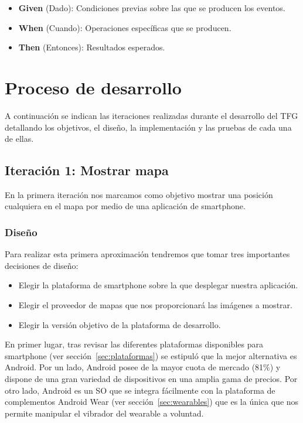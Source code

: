 \begin{itemize}
  \item \textbf{Given} (Dado): Condiciones previas sobre las que se producen los eventos.
  \item \textbf{When} (Cuando): Operaciones específicas que se producen.
  \item \textbf{Then} (Entonces): Resultados esperados.
\end{itemize}

\section{Proceso de desarrollo}

A continuación se indican las iteraciones realizadas durante el desarrollo del \acs{TFG} detallando
los objetivos, el diseño, la implementación y las pruebas de cada una de ellas.

\subsection{Iteración 1: Mostrar mapa}

En la primera iteración nos marcamos como objetivo mostrar una posición cualquiera en el mapa por
medio de una aplicación de smartphone.

\subsubsection{Diseño}

Para realizar esta primera aproximación tendremos que tomar tres importantes decisiones de diseño:

\begin{itemize}
  \item Elegir la plataforma de smartphone sobre la que desplegar nuestra aplicación.
  \item Elegir el proveedor de mapas que nos proporcionará las imágenes a mostrar.
  \item Elegir la versión objetivo de la plataforma de desarrollo.
\end{itemize}

En primer lugar, tras revisar las diferentes plataformas disponibles para smartphone (ver
sección~\ref{sec:plataformas}) se estipuló que la mejor alternativa es Android. Por un lado, Android
posee de la mayor cuota de mercado (81\%) y dispone de una gran variedad de dispositivos en una
amplia gama de precios. Por otro lado, Android es un \acs{SO} que se integra fácilmente con la
plataforma de complementos Android Wear (ver sección~\ref{sec:wearables}) que es la única que nos
permite manipular el vibrador del wearable a voluntad.

